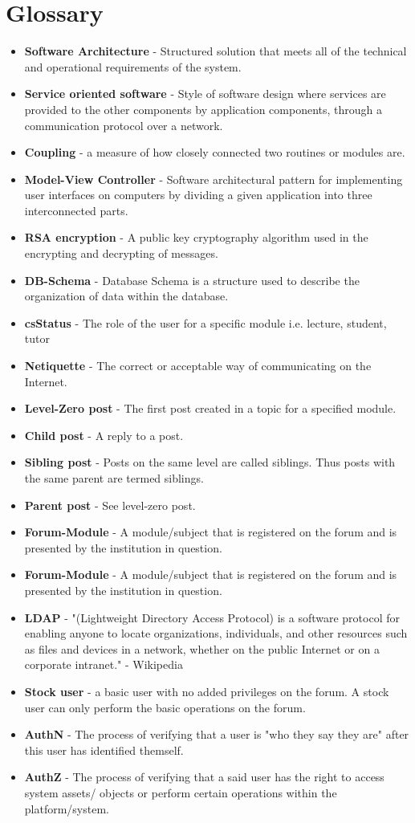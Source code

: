 \documentclass[12pt]{article}
\begin{document}
\section{Glossary}
\begin{itemize}
\item {\textbf{Software Architecture} -  Structured solution that meets all of the technical and operational requirements of the system.}
\item {\textbf{Service oriented software} -  Style of software design where services are provided to the other components by application components, through a communication protocol over a network.}
\item{\textbf{Coupling} - a measure of how closely connected two routines or modules are.}
\item {\textbf{Model-View Controller} - Software architectural pattern for implementing user interfaces on computers by dividing a given application into three interconnected parts.}
\item{\textbf{RSA encryption} - A  public key cryptography algorithm used in the encrypting and decrypting of messages.}
\item{\textbf{DB-Schema} - Database Schema is a structure used to describe the organization of data within the database.}
\item{\textbf{csStatus} - The role of the user for a specific module i.e. lecture, student, tutor}
\item{\textbf{Netiquette} - The correct or acceptable way of communicating on the Internet. }
\item{\textbf{Level-Zero post} - The first post created in a topic for a specified module. }
\item{\textbf{Child post} - A reply to a post.}
\item{\textbf{Sibling post} - Posts on the same level are called siblings. Thus posts with the same parent are termed siblings.}
\item{\textbf{Parent post} - See level-zero post. }
\item{\textbf{Forum-Module} - A module/subject that is registered on the forum and is presented by the institution in question.}
\item{\textbf{Forum-Module} - A module/subject that is registered on the forum and is presented by the institution in question.}
\item{\textbf{LDAP} - "(Lightweight Directory Access Protocol) is a software protocol for enabling anyone to locate organizations, individuals, and other resources such as files and devices in a network, whether on the public Internet or on a corporate intranet." - Wikipedia}
\item{\textbf{Stock user} - a basic user with no added privileges on the forum. A stock user can only perform the basic operations on the forum.}
\item{\textbf{AuthN} - The process of verifying that a user is "who they say they are" after this user has identified themself.}
\item{\textbf{AuthZ} - The process of verifying that a said user has the right to access system assets/ objects or perform certain operations within the platform/system.}
\end{itemize}
\end{document}

